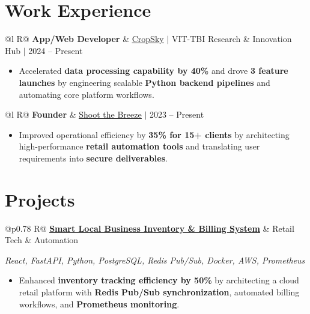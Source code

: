 \documentclass[a4paper,10pt]{article}
\newcommand{\ulink}[2]{\href{#1}{\uline{#2}}}
\newcommand{\subheading}[1]{{\color[HTML]{0A0A0A}\fontsize{12}{14}\selectfont\bfseries #1}}
\newcommand{\techstack}[1]{{\color[HTML]{5C5C5C}\fontsize{10.5}{12.5}\selectfont\itshape #1}}
\newcommand{\meta}[1]{{\color[HTML]{5C5C5C}\fontsize{10.5}{12.5}\selectfont #1}}
\begin{document}
\vspace{2pt}

\section{Work Experience}
\vspace{2pt}

\begin{tabularx}{\linewidth}{@{}l R@{}}
\subheading{App/Web Developer} & \meta{\ulink{https://sites.google.com/view/cropsky/home}{CropSky} $|$ VIT-TBI Research \& Innovation Hub $|$ 2024 -- Present}
\end{tabularx}
\begin{itemize}[nosep, leftmargin=1.5em, itemsep=1pt, topsep=2pt]
  \item {\color[HTML]{0A0A0A}\fontsize{11}{14}\selectfont Accelerated \textbf{data processing capability by 40\%} and drove \textbf{3 feature launches} by engineering scalable \textbf{Python backend pipelines} and automating core platform workflows.}
\end{itemize}

\vspace{2pt}

\begin{tabularx}{\linewidth}{@{}l R@{}}
\subheading{Founder} & \meta{\ulink{https://shoot-the-breeze.vercel.app}{Shoot the Breeze} $|$ 2023 -- Present}
\end{tabularx}
\begin{itemize}[nosep, leftmargin=1.5em, itemsep=1pt, topsep=2pt]
  \item {\color[HTML]{0A0A0A}\fontsize{11}{14}\selectfont Improved operational efficiency by \textbf{35\% for 15+ clients} by architecting high-performance \textbf{retail automation tools} and translating user requirements into \textbf{secure deliverables}.}
\end{itemize}

\vspace{2pt}

\section{Projects}
\vspace{2pt}

\begin{tabularx}{\linewidth}{@{}p{0.78\linewidth} R@{}}
\subheading{\ulink{https://github.com/su-jin1425/Smart-Local-Business-Inventory-Billing-System}{Smart Local Business Inventory \& Billing System}} & \meta{Retail Tech \& Automation}
\end{tabularx}
\vspace{1pt}
\techstack{React, FastAPI, Python, PostgreSQL, Redis Pub/Sub, Docker, AWS, Prometheus}
\begin{itemize}[nosep, leftmargin=1.5em, itemsep=1pt, topsep=2pt]
  \item {\color[HTML]{0A0A0A}\fontsize{11}{14}\selectfont Enhanced \textbf{inventory tracking efficiency by 50\%} by architecting a cloud retail platform with \textbf{Redis Pub/Sub synchronization}, automated billing workflows, and \textbf{Prometheus monitoring}.}
\end{itemize}
\end{document}
